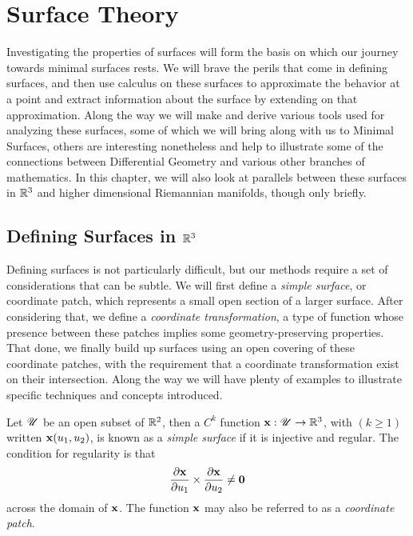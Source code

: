 \section{Surface Theory}

Investigating the properties of surfaces will form the basis on which our journey towards minimal surfaces rests. We will brave the perils that come in defining surfaces, and then use calculus on these surfaces to approximate the behavior at a point and extract information about the surface by extending on that approximation. Along the way we will make and derive various tools used for analyzing these surfaces, some of which we will bring along with us to Minimal Surfaces, others are interesting nonetheless and help to illustrate some of the connections between Differential Geometry and various other branches of mathematics. In this chapter, we will also look at parallels between these surfaces in $\mathbb{R}^3$ and higher dimensional Riemannian manifolds, though only briefly.

\subsection{Defining Surfaces in $\mathbb{R}^3$}

Defining surfaces is not particularly difficult, but our methods require a set of considerations that can be subtle. We will first define a \emph{simple surface}, or coordinate patch, which represents a small open section of a larger surface. After considering that, we define a \emph{coordinate transformation}, a type of function whose presence between these patches implies some geometry-preserving properties. That done, we finally build up surfaces using an open covering of these coordinate patches, with the requirement that a coordinate transformation exist on their intersection. Along the way we will have plenty of examples to illustrate specific techniques and concepts introduced.

\begin{defn} %
  Let $\mathscr{U}$ be an open subset of $\mathbb{R}^2$, then a $C^k$ function $\mathbf{x}: \mathscr{U} \to \mathbb{R}^3$, with $(k \ge 1)$ written $\mathbf{x}(u_1, u_2)$, is known as a \emph{simple surface} if it is injective and regular. The condition for regularity is that
  \[
    \frac{\partial\mathbf{x}}{\partial u_1} \times \frac{\partial\mathbf{x}}{\partial u_2} \neq \mathbf{0}
  \]
  across the domain of $\mathbf{x}$. The function $\mathbf{x}$ may also be referred to as a \emph{coordinate patch}.
\end{defn}

